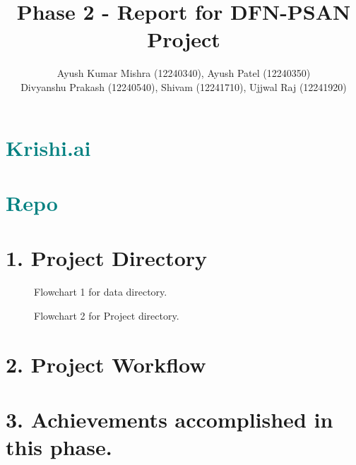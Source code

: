 \documentclass[12pt,a4paper]{article}
\title{\textbf{Phase 2 - Report for DFN-PSAN Project}}
\author{
    Ayush Kumar Mishra (12240340), Ayush Patel (12240350) \\ %
    Divyanshu Prakash (12240540), Shivam (12241710), Ujjwal Raj (12241920) %
}
\date{}
\newcommand{\colorsection}[1]{{\color{sectioncolor}\Large\bfseries#1}}
\begin{document}
\maketitle

\begin{center}
    \section*{\textcolor{teal}{\huge{Krishi.ai \href{https://krishi-ai.onrender.com/}{\faExternalLink}}}}
    \section*{\textcolor{teal}{\large{Repo \href{https://github.com/shivamlth27/Krishi_ai}{\faExternalLink}}}}
\end{center}

\section*{\colorsection{1. Project Directory}}
\begin{figure}[H] %
    \centering
    \caption{Flowchart 1 for data directory.}
\end{figure}
\begin{figure}[H] %
    \centering
    \caption{Flowchart 2 for Project directory.}
\end{figure}
\section*{\colorsection{2. Project Workflow}}
\section*{\colorsection{3. Achievements accomplished in this phase.}}
\end{document}
